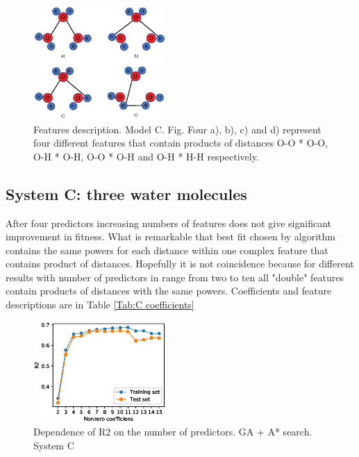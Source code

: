 \documentclass[aip,jcp,reprint,amsmath,amssymb,nature]{revtex4-1}
\begin{document}
\begin{figure}
\includegraphics[width=0.45\textwidth]{media/water_distances_2.eps}
\caption{Features description. Model C. Fig. Four a), b), c) and d) represent four different features that contain products of distances O-O * O-O, O-H * O-H, O-O * O-H  and O-H * H-H respectively.}\label{Fig:C Dist1}
\end{figure}

\subsection{System C: three water molecules}

After four predictors increasing numbers of features does not give significant improvement in fitness. What is remarkable that best fit chosen by algorithm contains the same powers for each distance within one complex feature that contains product of distances. Hopefully it is not coincidence because for different results with number of predictors in range from two to ten all "double" features contain products of distances with the same powers. Coefficients and feature descriptions are in Table \ref{Tab:C coefficients}

\begin{figure}
\includegraphics[width=0.45\textwidth]{media/C_GA_PATH_R2.eps}
\caption{Dependence of R2 on the number of predictors. GA + A* search. System C}\label{Fig:C_R2}
\end{figure}
\end{document}

